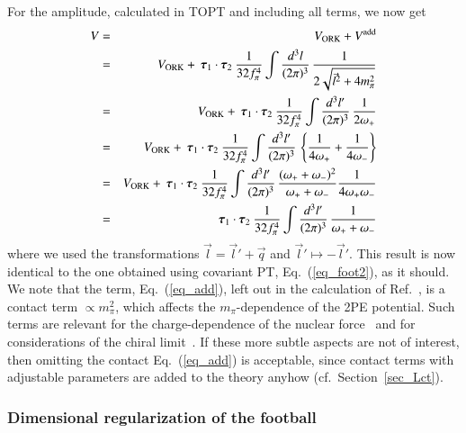 \documentclass[sort&compress,preprint,3p]{elsarticle}
\newcommand{\bbox}[1]{\mbox{\boldmath $#1$}}
\begin{document}
For the amplitude, calculated in TOPT and including all terms, we now get
\begin{eqnarray}
V 
&=& V_{\rm ORK} + 
V^{\rm add}\\
&=& V_{\rm ORK} + 
\: \bbox{\tau}_1 \cdot \bbox{\tau}_2 \:
\frac{1}{32f_\pi^4} 
\int \frac{d^3 l}{(2\pi)^3} \, \frac{1}{2\sqrt{\vec l^2 + 4m_\pi^2}}
\\ &=& V_{\rm ORK} + 
\: \bbox{\tau}_1 \cdot \bbox{\tau}_2 \:
\frac{1}{32 f_\pi^4} 
\int \frac{d^3 l'}{(2\pi)^3} \,
\frac{1}{2\omega_+} 
\\ &=& V_{\rm ORK} + 
\: \bbox{\tau}_1 \cdot \bbox{\tau}_2 \:
\frac{1}{32 f_\pi^4} 
\int \frac{d^3 l'}{(2\pi)^3} \,
\left\{
\frac{1}{4\omega_+} +
\frac{1}{4\omega_-}
\right\}
\\ &=& V_{\rm ORK} + 
\: \bbox{\tau}_1 \cdot \bbox{\tau}_2 \:
\frac{1}{32 f_\pi^4} 
\int \frac{d^3 l'}{(2\pi)^3} \,
\frac{(\omega_++\omega_-)^2}{\omega_++\omega_-}
\frac{1}{4\omega_+\omega_-}
\\ &=&
\: \bbox{\tau}_1 \cdot \bbox{\tau}_2 \:
\frac{1}{32 f_\pi^4} 
\int \frac{d^3 l'}{(2\pi)^3} \,
\frac{1}{\omega_++\omega_-}
\end{eqnarray}
%
where we used the transformations 
$\vec l=\vec l' +\vec q$ 
and $\vec l' \mapsto -\vec l'$.
This result is now identical to the one obtained
using covariant PT, Eq.~(\ref{eq_foot2}), as it should.
We note that the term, Eq.~(\ref{eq_add}), 
left out in the calculation of Ref.~\cite{ORK96},
is a contact term $\propto m_\pi^2$, which affects the $m_\pi$-dependence of
the 2PE potential. Such terms are relevant for the charge-dependence of the nuclear force~\cite{WME01}
and for considerations of the chiral limit~\cite{EMG03}.
If these more subtle aspects are not of interest, then omitting the contact Eq.~(\ref{eq_add})
is acceptable,
since contact terms with adjustable parameters
are added to the theory anyhow (cf.\ Section~\ref{sec_Lct}).


\subsubsection{Dimensional regularization of the football}
\end{document}
